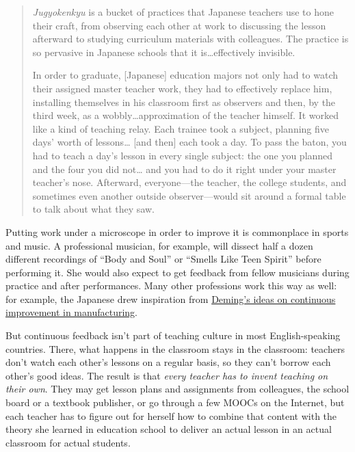 \begin{quote}\setlength{\parindent}{0pt}
\emph{Jugyokenkyu} is a bucket of practices that Japanese teachers use to
hone their craft, from observing each other at work to discussing the
lesson afterward to studying curriculum materials with colleagues. The
practice is so pervasive in Japanese schools that it
is\ldots{}effectively invisible.

In order to graduate, {[}Japanese{]} education majors not only had to
watch their assigned master teacher work, they had to effectively
replace him, installing themselves in his classroom first as
observers and then, by the third week, as a wobbly\ldots{}approximation
of the teacher himself. It worked like a kind of teaching
relay. Each trainee took a subject, planning five days' worth of
lessons\ldots{} {[}and then{]} each took a day. To pass the baton, you had to
teach a day's lesson in every single subject: the one you planned
and the four you did not\ldots{} and you had to do it right under your
master teacher's nose. Afterward, everyone---the teacher, the
college students, and sometimes even another outside
observer---would sit around a formal table to talk about what they
saw.
\end{quote}

Putting work under a microscope in order to improve it is commonplace
in sports and music. A professional musician, for example, will
dissect half a dozen different recordings of ``Body and Soul'' or
``Smells Like Teen Spirit'' before performing it. She would also expect
to get feedback from fellow musicians during practice and after
performances. Many other professions work this way as well: for
example, the Japanese drew inspiration from \href{https://en.wikipedia.org/wiki/W._Edwards_Deming}{Deming's ideas on
continuous improvement in manufacturing}.

But continuous feedback isn't part of teaching culture in most
English-speaking countries. There, what happens in the classroom stays
in the classroom: teachers don't watch each other's lessons on a
regular basis, so they can't borrow each other's good ideas. The
result is that \emph{every teacher has to invent teaching on their
own}. They may get lesson plans and assignments from colleagues, the
school board or a textbook publisher, or go through a few MOOCs on the
Internet, but each teacher has to figure out for herself how to
combine that content with the theory she learned in education school
to deliver an actual lesson in an actual classroom for actual
students.

